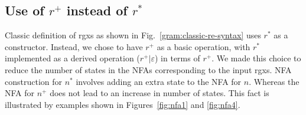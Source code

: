 \subsection{Use of $r^+$ instead of $r^*$}
Classic definition of \glspl{rgx} as shown in
Fig.~\ref{gram:classic-re-syntax} uses $r^*$ as a constructor.
Instead, we chose to have $r^+$ as a basic operation, with $r^*$
implemented as a derived operation ($r^+|\varepsilon$) in terms of
$r^+$.
We made this choice to reduce the number of states in the \glspl{NFA}
corresponding to the input \glspl{rgx}.
%
\gls{NFA} construction for $n^*$ involves adding an extra state to the
\gls{NFA} for $n$.
Whereas the \gls{NFA} for $n^+$ does not lead to an increase in number
of states.
This fact is illustrated by examples shown in Figures~\ref{fig:nfa1}
and \ref{fig:nfa4}.

